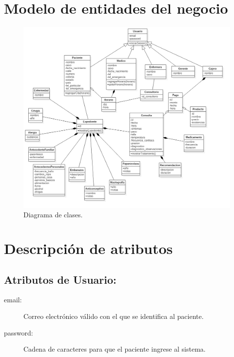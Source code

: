 \section{Modelo de entidades del negocio}

\begin{figure}[htbp!]
		\centering
			\includegraphics[width=1.1\textwidth]{images/Diagrama_clases}
		\caption{Diagrama de clases.}
	\end{figure}

\newpage

\section{Descripción de atributos}



\subsection{Atributos de Usuario:}
\begin{description}
\item[email: ]Correo electrónico válido con el que se identifica al paciente.
\item[password: ]Cadena de caracteres para que el paciente ingrese al sistema.
\end{description}

